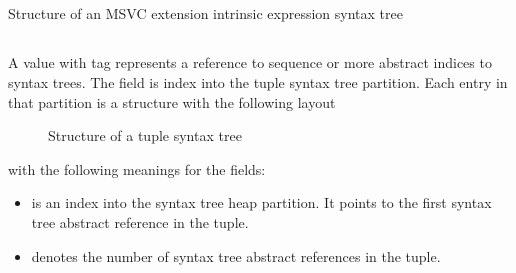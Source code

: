 
\subsection{}
\label{sec:ifc:SyntaxSort:TypeTraitIntrinsic}

\begin{Structure}
	\caption{Structure of an MSVC extension intrinsic expression syntax tree}
	\label{fig:ifc:SyntaxSort:TypeTraitIntrinsic}
\end{Structure}



\subsection{}
\label{sec:ifc:SyntaxSort:Tuple}

A  value with tag  represents a reference
to sequence or more abstract indices to syntax trees. 
The  field is index into the tuple syntax tree partition.
Each entry in that partition is a structure with the following layout
%
\begin{figure}[H]
	\centering
	\caption{Structure of a tuple syntax tree}
	\label{fig:ifc-tuple-syntax-tree-structure}
\end{figure}
%
with the following meanings for the fields:
\begin{itemize}
	\item {} is an index into the syntax tree heap partition. It points to the first syntax tree abstract reference in the tuple.
	\item {} denotes the number of syntax tree abstract references in the tuple.
\end{itemize}

	
	
\subsection{}
\label{sec:ifc:SyntaxSort:AsmStatement}

